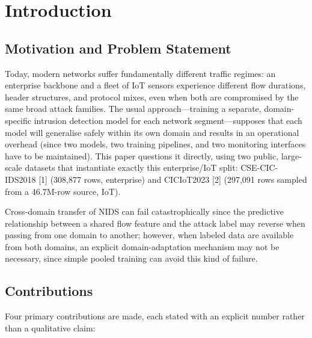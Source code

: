 \documentclass[conference]{IEEEtran}
\begin{document}
\section{Introduction}

\subsection{Motivation and Problem Statement}

Today, modern networks suffer fundamentally different traffic regimes: an enterprise backbone and a fleet of IoT sensors experience different flow durations, header structures, and protocol mixes, even when both are compromised by the same broad attack families. The usual approach---training a separate, domain-specific intrusion detection model for each network segment---supposes that each model will generalise safely within its own domain and results in an operational overhead (since two models, two training pipelines, and two monitoring interfaces have to be maintained). This paper questions it directly, using two public, large-scale datasets that instantiate exactly this enterprise/IoT split: CSE-CIC-IDS2018 [1] (308,877 rows, enterprise) and CICIoT2023 [2] (297,091 rows sampled from a 46.7M-row source, IoT).

Cross-domain transfer of NIDS can fail catastrophically since the predictive relationship between a shared flow feature and the attack label may reverse when passing from one domain to another; however, when labeled data are available from both domains, an explicit domain-adaptation mechanism may not be necessary, since simple pooled training can avoid this kind of failure.

\subsection{Contributions}

Four primary contributions are made, each stated with an explicit number rather than a qualitative claim:
\end{document}

